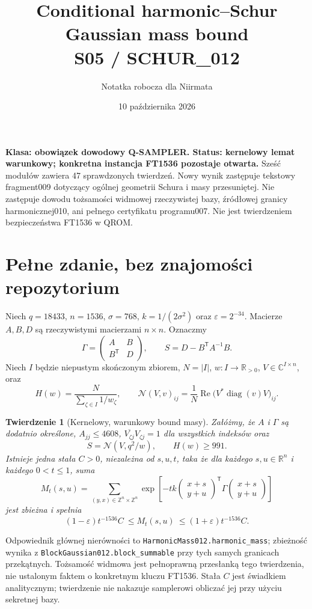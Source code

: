 \documentclass[11pt,a4paper]{article}
\title{Conditional harmonic--Schur Gaussian mass bound\\\large S05 / SCHUR\_012}
\author{Notatka robocza dla Niirmata}\date{10 października 2026}
\newcommand{\code}[1]{\nolinkurl{#1}}
\newtheorem{theorem}{Twierdzenie}
\begin{document}
\maketitle
\textbf{Klasa: obowiązek dowodowy Q-SAMPLER. Status: kernelowy lemat
warunkowy; konkretna instancja FT1536 pozostaje otwarta.}
Sześć modułów zawiera 47 sprawdzonych twierdzeń. Nowy wynik zastępuje
tekstowy fragment009 dotyczący ogólnej geometrii Schura i masy przesuniętej.
Nie zastępuje dowodu tożsamości widmowej rzeczywistej bazy, źródłowej
granicy harmonicznej010, ani pełnego certyfikatu programu007.
Nie jest twierdzeniem bezpieczeństwa FT1536 w QROM.

\section{Pełne zdanie, bez znajomości repozytorium}
Niech $q=18433$, $n=1536$, $\sigma=768$, $k=1/(2\sigma^2)$ oraz
$\varepsilon=2^{-34}$. Macierze $A,B,D$ są rzeczywistymi macierzami
$n\times n$. Oznaczmy
\[
 \Gamma=\begin{pmatrix}A&B\\ B^{\mathsf T}&D\end{pmatrix},\qquad
 S=D-B^{\mathsf T}A^{-1}B.
\]
Niech $I$ będzie niepustym skończonym zbiorem, $N=|I|$,
$w:I\to\mathbb R_{>0}$, $V\in\mathbb C^{I\times n}$, oraz
\[
 H(w)=\frac{N}{\sum_{\zeta\in I}1/w_\zeta},\qquad
 \mathcal N(V,v)_{ij}=\frac1N
       \operatorname{Re}\bigl(V^*\operatorname{diag}(v)V\bigr)_{ij}.
\]
\begin{theorem}[Kernelowy, warunkowy bound masy]
Załóżmy, że $A$ i $\Gamma$ są dodatnio określone, $A_{jj}\le4608$,
$\overline{V_{\zeta j}}V_{\zeta j}=1$ dla wszystkich indeksów oraz
\[
 S=\mathcal N(V,q^2/w),\qquad H(w)\ge991.
\]
Istnieje jedna stała $C>0$, niezależna od $s,u,t$, taka że dla każdego
$s,u\in\mathbb R^n$ i każdego $0<t\le1$, suma
\[
 M_t(s,u)=\sum_{(y,x)\in\mathbb Z^n\times\mathbb Z^n}
 \exp\!\left[-tk
 \begin{pmatrix}x+s\\y+u\end{pmatrix}^{\!\mathsf T}
 \Gamma\begin{pmatrix}x+s\\y+u\end{pmatrix}\right]
\]
jest zbieżna i spełnia
\[
 (1-\varepsilon)t^{-1536}C\ \le M_t(s,u)\ \le
 (1+\varepsilon)t^{-1536}C.
\]
\end{theorem}
Odpowiednik głównej nierówności to \code{HarmonicMass012.harmonic_mass};
zbieżność wynika z \code{BlockGaussian012.block_summable} przy tych samych
granicach przekątnych. Tożsamość widmowa jest pełnoprawną przesłanką
tego twierdzenia, nie ustalonym faktem o konkretnym kluczu FT1536.
Stała $C$ jest świadkiem analitycznym; twierdzenie nie nakazuje samplerowi
obliczać jej przy użyciu sekretnej bazy.
\end{document}
